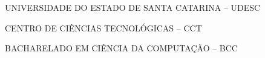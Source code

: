 

\renewcommand{\imprimircapa}{%
	\begin{capa}%
		\center

		{\fontseries{b}\selectfont\MakeTextUppercase{UNIVERSIDADE DO ESTADO DE SANTA CATARINA -- UDESC}}

		{\fontseries{b}\selectfont\MakeTextUppercase{CENTRO DE CIÊNCIAS TECNOLÓGICAS -- CCT  }}

		{\fontseries{b}\selectfont\MakeTextUppercase{BACHARELADO EM CIÊNCIA DA COMPUTAÇÃO -- BCC  }}

		\vfill

		{\fontseries{b}\selectfont\MakeTextUppercase{\normalsize\imprimirautor}}

		\vfill
		\begin{center}
			{\fontseries{b}\selectfont\MakeTextUppercase{\imprimirtitulo}}
		\end{center}
		\vfill

		\vfill

		{\fontseries{b}\selectfont\MakeTextUppercase{\imprimirlocal}}
		\par
		{\selectfont \imprimirdata}
		\vspace*{1cm}
	\end{capa}
}

\imprimircapa